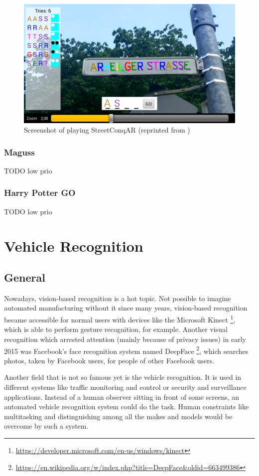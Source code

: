 \begin{figure}[bth]
  \centering
        \includegraphics[width=.65\linewidth]{gfx/streetconqar_gameplay_reprint}
        \caption{Screenshot of playing StreetConqAR (reprinted from \citep{hock2014augmented})}
        \label{fig:streetConqARGameplay}
\end{figure}

\subsubsection{Maguss}
TODO low prio

\subsubsection{Harry Potter GO}
TODO low prio


\section{Vehicle Recognition}

\subsection{General}
Nowadays, vision-based recognition is a hot topic. Not possible to imagine automated manufacturing without it since many years, vision-based recognition became accessible for normal users with devices like the Microsoft Kinect \footnote{\url{https://developer.microsoft.com/en-us/windows/kinect}}, which is able to perform gesture recognition, for example. Another visual recognition which arrested attention (mainly because of privacy issues) in early 2015 was Facebook's face recognition system named DeepFace \footnote{\url{https://en.wikipedia.org/w/index.php?title=DeepFace&oldid=663499386}}, which searches photos, taken by Facebook users, for people of other Facebook users.

Another field that is not so famous yet is the vehicle recognition. It is used in different systems like traffic monitoring and control or security and surveillance applications. Instead of a human observer sitting in front of some screens, an automated vehicle recognition system could do the task. Human constraints like multitasking and distinguishing among all the makes and models would be overcome by such a system.

